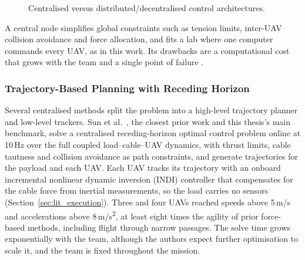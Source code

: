 \begin{figure}[h]
\caption{Centralised versus distributed/decentralised control architectures.}
\label{fig:arch_comparison}
\end{figure}

A central node simplifies global constraints such as tension limits, inter-UAV collision avoidance and force allocation, and fits a lab where one computer commands every UAV, as in this work. Its drawbacks are a computational cost that grows with the team and a single point of failure \cite{dimakosStudyCentralisedDecentralised2021}.

\subsubsection{Trajectory-Based Planning with Receding Horizon}

Several centralised methods split the problem into a high-level trajectory planner and low-level trackers. Sun et al.\ \cite{tudelft}, the closest prior work and this thesis's main benchmark, solve a centralised receding-horizon optimal control problem online at 10\,Hz over the full coupled load--cable--UAV dynamics, with thrust limits, cable tautness and collision avoidance as path constraints, and generate trajectories for the payload and each UAV. Each UAV tracks its trajectory with an onboard incremental nonlinear dynamic inversion (INDI) controller that compensates for the cable force from inertial measurements, so the load carries no sensors (Section~\ref{sec:lit_execution}). Three and four UAVs reached speeds above 5\,m/s and accelerations above 8\,m/s\textsuperscript{2}, at least eight times the agility of prior force-based methods, including flight through narrow passages. The solve time grows exponentially with the team, although the authors expect further optimisation to scale it, and the team is fixed throughout the mission.

